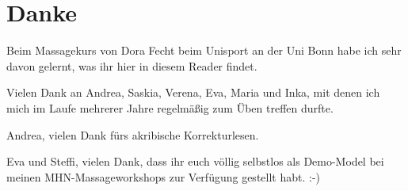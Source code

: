 \section*{Danke}

Beim Massagekurs von Dora Fecht beim Unisport an der Uni Bonn habe ich sehr davon gelernt, was ihr hier in diesem Reader findet.

Vielen Dank an Andrea, Saskia, Verena, Eva, Maria und Inka, mit denen ich mich im Laufe mehrerer Jahre regelmäßig zum Üben treffen durfte.

Andrea, vielen Dank fürs akribische Korrekturlesen.

Eva und Steffi, vielen Dank, dass ihr euch völlig selbstlos als Demo-Model bei meinen MHN-Massageworkshops zur Verfügung gestellt habt. :-)

